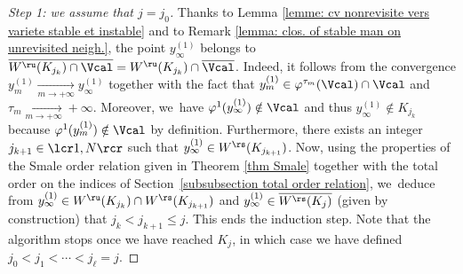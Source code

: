 \begin{proof}[Step 1: we assume that $j = j_0$]
Thanks to Lemma \ref{lemme: cv nonrevisite vers variete stable et instable} and to Remark \ref{lemma: clos. of stable man on unrevisited neigh.}, the point $y_{\infty}^{(1)}$ belongs to $\overline{W^\ru (K_{j_k})\cap \Vcal} = W^\ru (K_{j_k})\cap \overline{\Vcal}$. Indeed, it follows from the convergence $y_m^{(1)} \underset{m \to +\infty}{\to} y_{\infty}^{(1)}$ together with the fact that $y_m^{(1)} \in \varphi^{\tau_m} (\Vcal) \cap \Vcal$ and $\tau_m \underset{m \to +\infty}{\to} +\infty$. Moreover, we~have $\varphi^{1} (y_{\infty}^{(1)}) \notin \Vcal$ and thus $y_{\infty}^{(1)} \notin K_{j_k}$ because $\varphi^1 (y_m^{(1)}) \notin \Vcal$ by definition. Furthermore, there exists an integer $ j_{k +1}\in\lcr1,N\rcr$ such that $y_{\infty}^{(1)} \in W^\rs (K_{j_{k+1}})$. Now, using the properties of the Smale order relation given in Theorem \ref{thm Smale} together with the total order on the indices of Section~\ref{subsubsection total order relation}, we~deduce from $y_{\infty}^{(1)} \in W^\ru (K_{j_{k}}) \cap W^\rs (K_{j_{k+1}})$ and $y_{\infty}^{(1)} \in \overline{W^\rs (K_j)}$ (given by construction) that $j_k < j_{k+1} \leq j$.
This ends the induction step. Note that the algorithm stops once we have reached $K_j$, in which case we have defined $j_0 < j_1 < \cdots < j_{\ell} = j$.


\end{proof}
